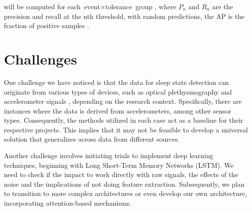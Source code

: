 \documentclass{article}
\begin{document}
will be computed for each \( \text{event} \times \text{tolerance} \) group \cite{child-mind-institute-detect-sleep-states}, where \(P_n\) and \(R_n\) are the precision and recall at the nth threshold, with random predictions, the AP is the fraction of positive samples \cite{scikit-learn}\cite{flach2015}.


\section{Challenges}

One challenge we have noticed is that the data for sleep state detection can originate from various types of devices, such as optical plethysmography and accelerometer signals \cite{Beattie_2017}\cite{Fedorin2019}, depending on the research context. Specifically, there are instances where the data is derived from accelerometers, among other sensor types. Consequently, the methods utilized in each case act as a baseline for their respective projects. This implies that it may not be feasible to develop a universal solution that generalizes across data from different sources.

Another challenge involves initiating trials to implement deep learning techniques, beginning with Long Short-Term Memory Networks (LSTM). We need to check if the impact to work directly with raw signals, the effects of the noise and the implications of not doing feature extraction. Subsequently, we plan to transition to more complex architectures or even develop our own architecture, incorporating attention-based mechanisms.


{
\small
}
\end{document}
